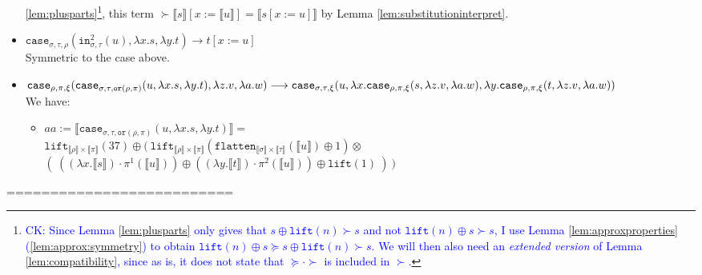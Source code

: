 \documentclass[runningheads,a4paper]{llncs}
\newcommand{\typeinterpret}[1]{\llbracket #1 \rrbracket}
\newcommand{\interpret}[1]{\llbracket #1 \rrbracket}
\newcommand{\red}{\longrightarrow}
\newcommand{\abs}[2]{\lambda #1.#2}
\newcommand{\proj}{\pi}
\newcommand{\flatten}{\mathtt{flatten}}
\newcommand{\lift}{\mathtt{lift}}
\newcommand{\CK}[1]{\textcolor{blue}{CK: #1}}
\begin{document}
\begin{itemize}
  \ref{lem:plusparts}\footnote{\CK{Since Lemma
  \ref{lem:plusparts} only gives that $s \oplus \lift(n) \succ s$ and
  not $\lift(n) \oplus s \succ s$, I use Lemma
  \ref{lem:approxproperties}(\ref{lem:approx:symmetry}) to obtain
  $\lift(n) \oplus s \succeq s \oplus \lift(n) \succ s$.  We will
  then also need an \emph{extended version} of Lemma
  \ref{lem:compatibility}, since as is, it does not state that
  $\succeq \cdot \succ$ is included in $\succ$.}}, this term
  $\succ \interpret{s}[x:=\interpret{u}] = \interpret{s[x:=u]}$ by
  Lemma \ref{lem:substitutioninterpret}.
\item $\mathtt{case}_{\sigma,\tau,\rho}(\mathtt{in}^2_{\sigma,\tau}(u),
  \abs{x}{s},\abs{y}{t}) \red t[x:=u]$ \\
  Symmetric to the case above.
\item $
\mathtt{case}_{\rho,\pi,\xi}(\mathtt{case}_{\sigma,\tau,\mathtt{or}(
  \rho,\pi)}(u,\abs{x}{s},\abs{y}{t}),\abs{z}{v},\abs{a}{w}) %
  \red\\
  \mathtt{case}_{\sigma,\tau,\xi}(u,
    \abs{x}{\mathtt{case}_{\rho,\pi,\xi}(s,\abs{z}{v},\abs{a}{w})},
    \abs{y}{\mathtt{case}_{\rho,\pi,\xi}(t,\abs{z}{v},\abs{a}{w})}) $\\
  We have:
  \begin{itemize}
  \item $aa := \interpret{\mathtt{case}_{\sigma,\tau,\mathtt{or}(\rho,
    \pi)}(u,\abs{x}{s},\abs{y}{t})} =$\\$
    \lift_{\typeinterpret{\rho} \times \typeinterpret{\pi}}(37) \oplus
    (\ \lift_{\typeinterpret{\rho} \times \typeinterpret{\pi}}(
      \flatten_{\typeinterpret{\sigma} \times \typeinterpret{\tau}}(
        \interpret{u}) \oplus 1) \otimes$ \\
    \phantom{x} \hfill
    $(\ ((\abs{x}{\interpret{s}}) \cdot \proj^1(\interpret{u})) \oplus
    ((\abs{y}{\interpret{t}}) \cdot \proj^2(\interpret{u})) \oplus
    \lift(1)\ )\ )$
  \end{itemize}
\end{itemize}

==========================
\end{document}
